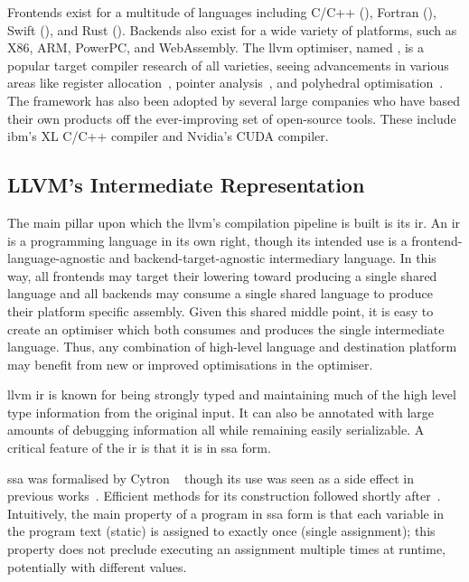 \documentclass[\main/thesis.tex]{subfiles}
\begin{document}
Frontends exist for a multitude of languages including C/C++ (), Fortran (), Swift (), and Rust ().
Backends also exist for a wide variety of platforms, such as X86, ARM, PowerPC, and WebAssembly.
The \gls{llvm} optimiser, named , is a popular target compiler research of all varieties, seeing advancements in various areas like register allocation~\autocite{lozano2019combinatorial,pereira2008register}, pointer analysis~\autocite{hardekopf2009semi,sui2016interprocedural}, and polyhedral optimisation~\autocite{grosser2011polly,alves2015runtime}.
The framework has also been adopted by several large companies who have based their own products off the ever-improving set of open-source tools.
These include \gls{ibm}'s XL C/C++ compiler and Nvidia's CUDA compiler.

\subsection{LLVM's Intermediate Representation}
\label{sec:ir}
The main pillar upon which the \gls{llvm}'s compilation pipeline is built is its \gls{ir}.
An \gls{ir} is a programming language in its own right, though its intended use is a frontend-language-agnostic and backend-target-agnostic intermediary language.
In this way, all frontends may target their \gls{lowering} toward producing a single shared language and all backends may consume a single shared language to produce their platform specific assembly.
Given this shared middle point, it is easy to create an optimiser which both consumes and produces the single intermediate language.
Thus, any combination of high-level language and destination platform may benefit from new or improved optimisations in the optimiser.

\Gls{llvm} \gls{ir} is known for being strongly typed and maintaining much of the high level type information from the original input.
It can also be annotated with large amounts of debugging information all while remaining easily serializable.
A critical feature of the \gls{ir} is that it is in \gls{ssa} form.

\Gls{ssa} was formalised by Cytron \etal~\autocite{cytron1989efficient} though its use was seen as a side effect in previous works~\autocite{rosen1988global,alpern1988detecting}.
Efficient methods for its construction followed shortly after~\autocite{cytron1991efficiently,brandis1994single}.
Intuitively, the main property of a program in \gls{ssa} form is that each variable in the program text (static) is assigned to exactly once (single assignment); this property does not preclude executing an assignment multiple times at runtime, potentially with different values.
\end{document}
